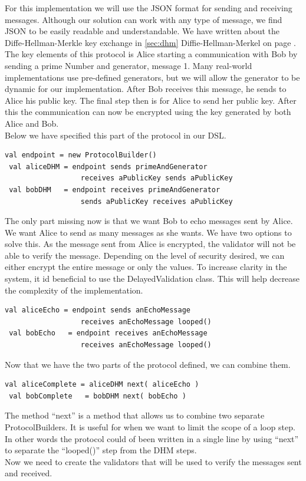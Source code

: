 For this implementation we will use the JSON format for sending and receiving messages. Although our solution can work with any type of message, we find JSON to be easily readable and understandable.
We have written about the Diffe-Hellman-Merkle key exchange in \ref{sec:dhm} Diffie-Hellman-Merkel on page \pageref{sec:dhm}. The key elements of this protocol is Alice starting a communication with Bob by sending a prime Number and generator, message 1. Many real-world implementations use pre-defined generators, but we will allow the generator to be dynamic for our implementation. After Bob receives this message, he sends to Alice his public key. The final step then is for Alice to send her public key. After this the communication can now be encrypted using the key generated by both Alice and Bob.
\\ 
Below we have specified this part of the protocol in our DSL.
\begin{lstlisting}[style=myScalastyle]
 val endpoint = new ProtocolBuilder()
 val aliceDHM = endpoint sends primeAndGenerator 
                  receives aPublicKey sends aPublicKey
 val bobDHM   = endpoint receives primeAndGenerator 
                  sends aPublicKey receives aPublicKey
\end{lstlisting}
The only part missing now is that we want Bob to echo messages sent by Alice. We want Alice to send as many messages as she wants. We have two options to solve this. As the message sent from Alice is encrypted, the validator will not be able to verify the message. Depending on the level of security desired, we can either encrypt the entire message or only the values. To increase clarity in the system, it id beneficial to use the DelayedValidation class. This will help decrease the complexity of the implementation.

\begin{lstlisting}[style=myScalastyle]
 val aliceEcho = endpoint sends anEchoMessage 
                  receives anEchoMessage looped()
 val bobEcho   = endpoint receives anEchoMessage
                  receives anEchoMessage looped()
\end{lstlisting}

Now that we have the two parts of the protocol defined, we can combine them.
\begin{lstlisting}[style=myScalastyle]
 val aliceComplete = aliceDHM next( aliceEcho )
 val bobComplete   = bobDHM next( bobEcho )
\end{lstlisting}
The method ``next'' is a method that allows us to combine two separate ProtocolBuilders. It is useful for when we want to limit the scope of a loop step. In other words the protocol could of been written in a single line by using ``next'' to separate the ``looped()'' step from the DHM steps.
\\
Now we need to create the validators that will be used to verify the messages sent and received.


